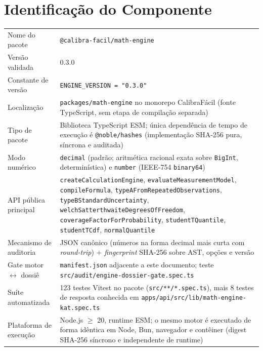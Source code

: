 \documentclass[11pt,a4paper]{article}
\newcommand{\docVersion}{0.3.0}
\begin{document}
\section{Identificação do Componente}

\begin{tabularx}{\textwidth}{l X}
  \toprule
  Nome do pacote          & \texttt{@calibra-facil/math-engine} \\
  Versão validada         & \docVersion \\
  Constante de versão     & \texttt{ENGINE\_VERSION = "\docVersion"} \\
  Localização             & \texttt{packages/math-engine} no monorepo CalibraFácil (fonte TypeScript, sem etapa de compilação separada) \\
  Tipo de pacote          & Biblioteca TypeScript ESM; única dependência de tempo de execução é \texttt{@noble/hashes} (implementação SHA-256 pura, síncrona e auditada) \\
  Modo numérico           & \texttt{decimal} (padrão; aritmética racional exata sobre \texttt{BigInt}, determinística) e \texttt{number} (IEEE-754 \texttt{binary64}) \\
  API pública principal   & \texttt{createCalculationEngine}, \texttt{evaluateMeasurementModel}, \texttt{compileFormula}, \texttt{typeAFromRepeatedObservations}, \texttt{typeBStandardUncertainty}, \texttt{welchSatterthwaiteDegreesOfFreedom}, \texttt{coverageFactorForProbability}, \texttt{studentTQuantile}, \texttt{studentTCdf}, \texttt{normalQuantile} \\
  Mecanismo de auditoria  & JSON canônico (números na forma decimal mais curta com \emph{round-trip}) + \emph{fingerprint} SHA-256 sobre AST, opções e versão \\
  Gate motor \(\leftrightarrow\) dossiê & \texttt{manifest.json} adjacente a este documento; teste \texttt{src/audit/engine-dossier-gate.spec.ts} \\
  Suíte automatizada      & 123 testes Vitest no pacote (\texttt{src/**/*.spec.ts}), mais 8 testes de resposta conhecida em \texttt{apps/api/src/lib/math-engine-kat.spec.ts} \\
  Plataforma de execução  & Node.js \(\geq\) 20, runtime ESM; o mesmo motor é executado de forma idêntica em Node, Bun, navegador e contêiner (digest SHA-256 síncrono e independente de runtime) \\
  \bottomrule
\end{tabularx}
\end{document}
